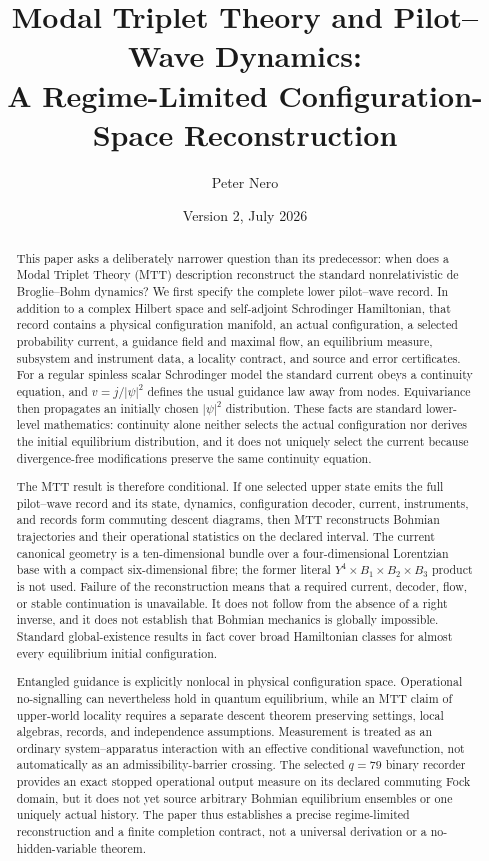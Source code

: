 \documentclass[11pt]{article}
\title{\vspace{-1em}
Modal Triplet Theory and Pilot--Wave Dynamics:\\[0.25em]
\large A Regime-Limited Configuration-Space Reconstruction}
\author{Peter Nero}
\date{Version 2, July 2026}
\theoremstyle{definition}
\theoremstyle{remark}
\begin{document}
\maketitle

\begin{abstract}
This paper asks a deliberately narrower question than its predecessor:
when does a Modal Triplet Theory (MTT) description reconstruct the standard
nonrelativistic de Broglie--Bohm dynamics?  We first specify the complete
lower pilot--wave record.  In addition to a complex Hilbert space and
self-adjoint Schrodinger Hamiltonian, that record contains a physical
configuration manifold, an actual configuration, a selected probability
current, a guidance field and maximal flow, an equilibrium measure,
subsystem and instrument data, a locality contract, and source and error
certificates.  For a regular spinless scalar Schrodinger model the standard
current obeys a continuity equation, and \(v=j/|\psi|^2\) defines the usual
guidance law away from nodes.  Equivariance then propagates an initially
chosen \(|\psi|^2\) distribution.  These facts are standard lower-level
mathematics: continuity alone neither selects the actual configuration nor
derives the initial equilibrium distribution, and it does not uniquely
select the current because divergence-free modifications preserve the same
continuity equation.

The MTT result is therefore conditional.  If one selected upper state emits
the full pilot--wave record and its state, dynamics, configuration decoder,
current, instruments, and records form commuting descent diagrams, then MTT
reconstructs Bohmian trajectories and their operational statistics on the
declared interval.  The current canonical geometry is a ten-dimensional
bundle over a four-dimensional Lorentzian base with a compact
six-dimensional fibre; the former literal
\(Y^4\times B_1\times B_2\times B_3\) product is not used.  Failure of the
reconstruction means that a required current, decoder, flow, or stable
continuation is unavailable.  It does not follow from the absence of a
right inverse, and it does not establish that Bohmian mechanics is globally
impossible.  Standard global-existence results in fact cover broad
Hamiltonian classes for almost every equilibrium initial configuration.

Entangled guidance is explicitly nonlocal in physical configuration space.
Operational no-signalling can nevertheless hold in quantum equilibrium,
while an MTT claim of upper-world locality requires a separate descent
theorem preserving settings, local algebras, records, and independence
assumptions.  Measurement is treated as an ordinary system--apparatus
interaction with an effective conditional wavefunction, not automatically
as an admissibility-barrier crossing.  The selected \(q=79\) binary recorder
provides an exact stopped operational output measure on its declared
commuting Fock domain, but it does not yet source arbitrary Bohmian
equilibrium ensembles or one uniquely actual history.  The paper thus
establishes a precise regime-limited reconstruction and a finite completion
contract, not a universal derivation or a no-hidden-variable theorem.
\end{abstract}
\end{document}
